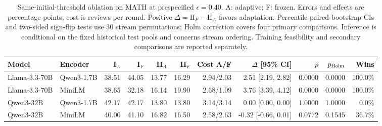 \begin{table}[t]
\centering
\small
\begin{tabular}{llrrrrrrrrr}
\toprule
Model & Encoder & I$_A$ & I$_F$ & II$_A$ & II$_F$ & Cost A/F & $\Delta$ [95\% CI] & $p$ & $p_{\rm Holm}$ & Wins \\
\midrule
Llama-3.3-70B & Qwen3-1.7B & 38.51 & 44.05 & 13.77 & 16.29 & 2.94/2.03 & 2.51 [2.19, 2.82] & 0.0000 & 0.0000 & 100.0\% \\
Llama-3.3-70B & MiniLM & 38.65 & 32.18 & 16.14 & 19.90 & 2.68/1.09 & 3.76 [3.39, 4.12] & 0.0000 & 0.0000 & 100.0\% \\
Qwen3-32B & Qwen3-1.7B & 42.17 & 42.17 & 13.80 & 13.80 & 3.14/3.14 & 0.00 [0.00, 0.00] & 1.0000 & 1.0000 & 0.0\% \\
Qwen3-32B & MiniLM & 40.00 & 41.10 & 16.82 & 16.50 & 2.58/2.63 & -0.32 [-0.66, 0.01] & 0.0772 & 0.1545 & 36.7\% \\
\bottomrule
\end{tabular}
\caption{Same-initial-threshold ablation on MATH at prespecified $\epsilon=0.40$. A: adaptive; F: frozen. Errors and effects are percentage points; cost is reviews per round. Positive $\Delta=\mathrm{II}_F-\mathrm{II}_A$ favors adaptation. Percentile paired-bootstrap CIs and two-sided sign-flip tests use 30 stream permutations; Holm correction covers four primary comparisons. Inference is conditional on the fixed historical test pools and concerns stream ordering. Training feasibility and secondary comparisons are reported separately.}
\label{tab:alpha-controlled}
\end{table}
